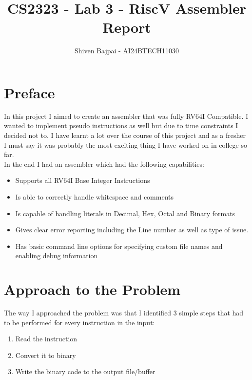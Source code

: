 \documentclass[12pt]{article}
\begin{document}
	
	\vspace{3cm}

	\title{CS2323 - Lab 3 - RiscV Assembler Report}
	\author{Shiven Bajpai - AI24BTECH11030}

	\maketitle
	\bigskip    	

	\renewcommand{\thefigure}{\theenumi}
	\renewcommand{\thetable}{\theenumi}

	\tableofcontents
	\newpage

    \section{Preface}
    In this project I aimed to create an assembler that was fully RV64I Compatible. I wanted to implement pseudo instructions as well but due to time constraints I decided not to. I have learnt a lot over the course of this project and as a fresher I must say it was probably the most exciting thing I have worked on in college so far.
    \\

    In the end I had an assembler which had the following capabilities:
    \begin{itemize}
        \item Supports all RV64I Base Integer Instructions
        \item Is able to correctly handle whitespace and comments
        \item Is capable of handling literals in Decimal, Hex, Octal and Binary formats
        \item Gives clear error reporting including the Line number as well as type of issue.
        \item Has basic command line options for specifying custom file names and enabling debug information
    \end{itemize}

    \section{Approach to the Problem}

    The way I approached the problem was that I identified 3 simple steps that had to be performed for every instruction in the input:

    \begin{enumerate}
		\item{Read the instruction}
		\item{Convert it to binary}
		\item{Write the binary code to the output file/buffer}
	\end{enumerate}
\end{document}

